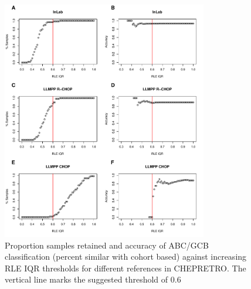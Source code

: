 \begin{figure}
	\begin{center}
		\includegraphics[width=0.8\textwidth]{figures/chep_rle_classification_abcgcb.pdf}
	\end{center}
	\caption{Proportion samples retained and accuracy of ABC/GCB classification (percent similar with cohort based) against increasing RLE IQR thresholds for different references in CHEPRETRO. The vertical line marks the suggested threshold of 0.6}
	\label{fig:chep_rle_clas_abcgcb}
\end{figure}

